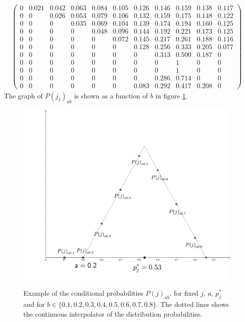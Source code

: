 \documentclass{article}
\begin{document}
\begin{align*}
	\begin{pmatrix}
		0     & 0.021 & 0.042 & 0.063 & 0.084 & 0.105 & 0.126 & 0.146 & 0.159 & 0.138 & 0.117 \\
		0     & 0     & 0.026 & 0.053 & 0.079 & 0.106 & 0.132 & 0.159 & 0.175 & 0.148 & 0.122 \\
		0     & 0     & 0     & 0.035 & 0.069 & 0.104 & 0.139 & 0.174 & 0.194 & 0.160 & 0.125 \\
		0     & 0     & 0     & 0     & 0.048 & 0.096 & 0.144 & 0.192 & 0.221 & 0.173 & 0.125 \\
		0     & 0     & 0     & 0     & 0     & 0.072 & 0.145 & 0.217 & 0.261 & 0.188 & 0.116 \\
		0     & 0     & 0     & 0     & 0     & 0     & 0.128 & 0.256 & 0.333 & 0.205 & 0.077 \\
		0     & 0     & 0     & 0     & 0     & 0     & 0     & 0.313 & 0.500 & 0.187 & 0     \\
		0     & 0     & 0     & 0     & 0     & 0     & 0     & 0     & 1     & 0     & 0     \\
		0     & 0     & 0     & 0     & 0     & 0     & 0     & 0     & 1     & 0     & 0     \\
		0     & 0     & 0     & 0     & 0     & 0     & 0     & 0.286 & 0.714 & 0     & 0     \\
		0     & 0     & 0     & 0     & 0     & 0     & 0.083 & 0.292 & 0.417 & 0.208 & 0
	\end{pmatrix}
\end{align*}
The graph of $P(j_1)_{ab}$ is shown as a function of $b$ in figure \ref{fig:function}.\par

\begin{figure}[h!]
    \centering
    \includegraphics[width = 14 cm]{img/geogebra-export (5).pdf}
    \caption{Example of the conditional probabilities $P(j)_{ab}$, for fixed $j$, $a$, $p^*_j$ and for $b \in \{0.1, 0.2, 0.3, 0.4, 0.5, 0.6, 0.7, 0.8\}$. The dotted lines shows the continuous interpolator of the distribution probabilities.}
	\label{fig:function}
\end{figure} 
\end{document}
